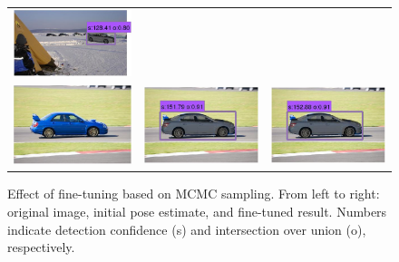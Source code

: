 \documentclass[10pt,twocolumn,letterpaper]{article}
\begin{document}
\begin{figure}[h]
\begin{tabular}{|ccc|}
  \includegraphics[width=0.22\linewidth]{supp/tuning_5c.png}  \\
  \includegraphics[width=0.22\linewidth]{supp/tuning_6a.png} &
  \includegraphics[width=0.22\linewidth]{supp/tuning_6b.png} & 
  \includegraphics[width=0.22\linewidth]{supp/tuning_6c.png}  \\
	\hline
  \end{tabular}
\caption{Effect of fine-tuning based on MCMC sampling. From left to
  right: original image, initial pose estimate, and fine-tuned
  result. Numbers indicate detection confidence (s) and intersection
  over union (o), respectively.} 
  \label{fig:tuning}
\end{figure}

{\small


}
\end{document}
